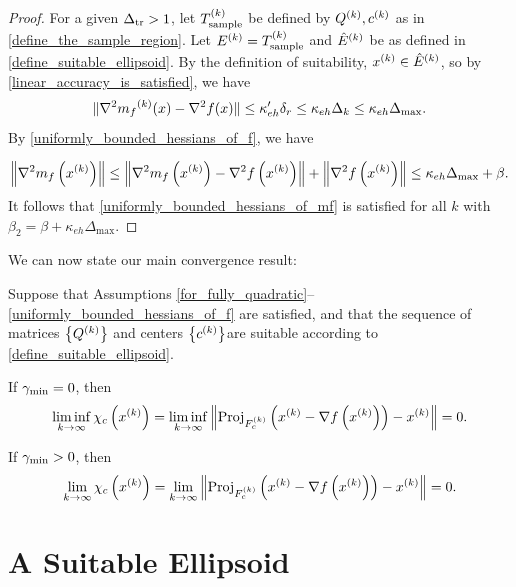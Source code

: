 \documentclass{article}
\begin{document}
\begin{proof}
For a given $\Delta_{\textrm{tr}} > 1$, let ${T_{\text{sample}}^{(k)}}$ be defined by ${Q^{(k)}}, c^{(k)}$ as in \cref{define_the_sample_region}.  Let ${E^{(k)}}={T_{\text{sample}}^{(k)}}$ and ${{\hat E}^{(k)}}$ be as defined in \cref{define_suitable_ellipsoid}.    By the definition of suitability, $x^{(k)} \in {{\hat E}^{(k)}}$, so by
\cref{linear_accuracy_is_satisfied}, we have  
\[\|\nabla^2 {{m}_f}^{(k)}(x) - \nabla^2 f(x)\| \le \kappa_{eh}'\delta_r \le \kappa_{eh} \Delta_k \le \kappa_{eh}\Delta_{\text{max}}.\]
By \cref{uniformly_bounded_hessians_of_f},  we have

\begin{align*}
\left\|\nabla^2 m_{f}\left(x^{(k)}\right)\right\| \le \left\|\nabla^2 m_{f}\left(x^{(k)}\right) - \nabla^2 f\left(x^{(k)}\right)  \right\| + \left\|\nabla^2 f\left(x^{(k)}\right) \right\|
\le \kappa_{eh}\Delta_{\text{max}} + \beta .
\end{align*}
It follows that \cref{uniformly_bounded_hessians_of_mf} is satisfied for all $k$ with $\beta_2 = \beta+\kappa_{eh}\Delta_{\text{max}}$.
\end{proof}




We can now state our main convergence result:

\begin{theorem}\label{main_result}
Suppose that Assumptions \cref{for_fully_quadratic}--\cref{uniformly_bounded_hessians_of_f} are satisfied,
and that the sequence of matrices $\left\{{Q^{(k)}}\right\}$ and centers $\left\{c^{(k)}\right\}$are suitable according to \cref{define_suitable_ellipsoid}.


If $\gamma_{\textrm{min}} = 0$, then
\begin{align*}
\liminf_{k\to\infty} \chi_c\left(x^{(k)}\right) = \liminf_{k\to\infty} \left\|{\textrm{Proj}}_{{F_c^{(k)}}}\left(x^{(k)} - \nabla f\left(x^{(k)}\right)\right) - x^{(k)} \right\| = 0.
\end{align*}

If $\gamma_{\textrm{min}} > 0$, then
\begin{align*}
\lim_{k\to\infty} \chi_c\left(x^{(k)}\right) = \lim_{k\to\infty} \left\|{\textrm{Proj}}_{{F_c^{(k)}}}\left(x^{(k)} - \nabla f\left(x^{(k)}\right)\right) - x^{(k)} \right\| = 0.
\end{align*}
\end{theorem}




\section{A Suitable Ellipsoid}
\label{sec:ellipsoidal}
\end{document}
